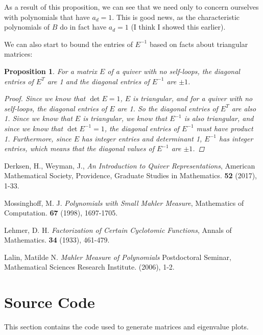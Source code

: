 \documentclass{amsart}
\theoremstyle{theorem}
\theoremstyle{theorem*}
\newtheorem{proposition}[theorem]{Proposition}
\theoremstyle{definition}
\begin{document}
As a result of this proposition, we can see that we need only to concern ourselves with polynomials that
have $a_d = 1$. This is good news, as the characteristic polynomials of $B$ do in fact
have $a_d = 1$ (I think I showed this earlier).

We can also start to bound the entries of $E^{-1}$ based on facts about triangular matrices:

\begin{proposition}
    For a matrix $E$ of a quiver with no self-loops, the diagonal entries of
    $E^T$ are 1 and the diagonal entries of $E^{-1}$ are $\pm 1$.
    \begin{proof}
        Since we know that $\det E = 1$, $E$ is triangular, and for a quiver with
        no self-loops, the diagonal entries of $E$ are 1. So the diagonal entries
        of $E^T$ are also 1. Since we know that $E$ is triangular,
        we know that $E^{-1}$ is also triangular, and since we know that
        $\det E^{-1} = 1$, the diagonal entries of $E^{-1}$ must have product 1.
        Furthermore, since $E$ has integer entries and determinant 1, $E^{-1}$ has integer entries, which means that the diagonal
        values of $E^{-1}$ are $\pm 1$. 
    \end{proof}
\end{proposition}

\begin{thebibliography}{99}

     Derksen, H., Weyman, J., {\em An Introduction to Quiver
            Representations\/}, American Mathematical Society, Providence,
    Graduate Studies in Mathematics. {\bf 52} (2017), 1-33.

     Mossinghoff, M. J. {\em Polynomials with Small Mahler
            Measure\/}, Mathematics of Computation. {\bf 67} (1998), 1697-1705.

     Lehmer, D. H. {\em Factorization of Certain Cyclotomic
            Functions\/}, Annals of Mathematics. {\bf 34} (1933), 461-479.

     Lalin, Matilde N. {\em Mahler Measure of Polynomials\/}
    Postdoctoral Seminar, Mathematical Sciences Research Institute. (2006), 1-2.

\end{thebibliography}
\pagebreak

\appendix

\section{Source Code}

This section contains the code used to generate matrices and eigenvalue plots.

\tiny

\end{document}

